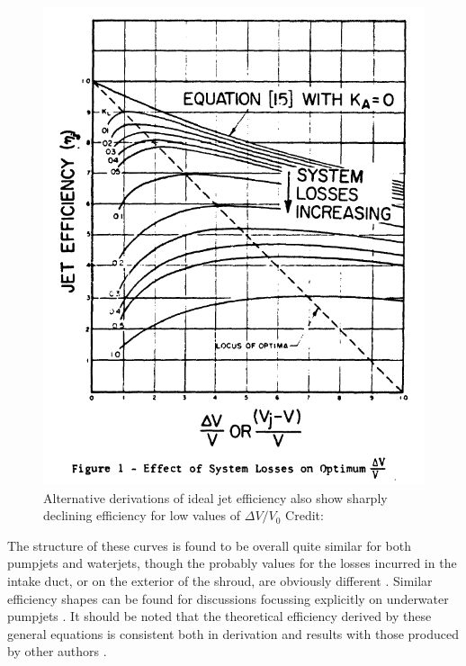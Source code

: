 \documentclass{article}\usepackage[]{graphicx}\usepackage[]{color}
\begin{document}
\begin{figure}
\includegraphics[width=\textwidth]{EfficiencyBrandau.png}
\caption{Alternative derivations of ideal jet efficiency also show sharply declining efficiency for low values of $\Delta V / V_0$ Credit: \cite{brandau1967}}
\label{fig:EfficiencyBrandau.png}
\end{figure}

The structure of these curves is found to be overall quite similar for both pumpjets and waterjets, though the probably values for the losses incurred in the intake duct, or on the exterior of the shroud, are obviously different \parencite[13-14]{wislicenus1973}.  Similar efficiency shapes can be found for discussions focussing explicitly on underwater pumpjets \parencite[13]{henderson1964}. It should be noted that the theoretical efficiency derived by these general equations is consistent both in derivation and results with those produced by other authors \parencite[227]{lewis1988}.
\end{document}
